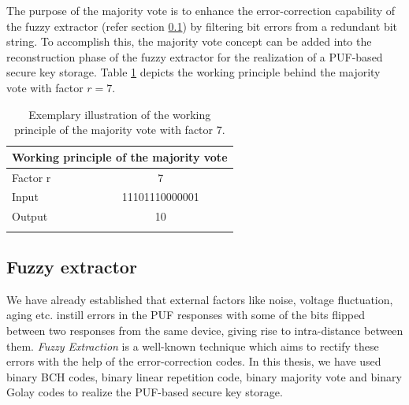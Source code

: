 The purpose of the majority vote is to enhance the error-correction capability of the fuzzy extractor (refer section \ref{fuzzy_section}) by filtering bit errors from a redundant bit string. To accomplish this, the majority vote concept can be added into the reconstruction phase of the fuzzy extractor for the realization of a PUF-based secure key storage. Table \ref{mv} depicts the working principle behind the majority vote with factor $r = 7$.

\begin{table}[!ht]
\begin{center}
\begin{tabular}{lc}
\toprule
\multicolumn{2}{c}{\textbf{Working principle of the majority vote}}\\
\midrule
Factor r & 7 \\
Input & 11101110000001\\
Output & 10\\
\addlinespace
\bottomrule
\end{tabular}
\end{center}
\caption{Exemplary illustration of the working principle of the majority vote with factor 7.}
\label{mv}
\end{table}

\subsection{Fuzzy extractor}
\label{fuzzy_section}
We have already established that external factors like noise, voltage fluctuation, aging etc. instill errors in the PUF responses with some of the bits flipped between two responses from the same device, giving rise to intra-distance between them. \emph{Fuzzy Extraction} is a well-known technique which aims to rectify these errors with the help of the error-correction codes. In this thesis, we have used binary BCH codes, binary linear repetition code, binary majority vote and binary Golay
codes to realize the PUF-based secure key storage.\\


